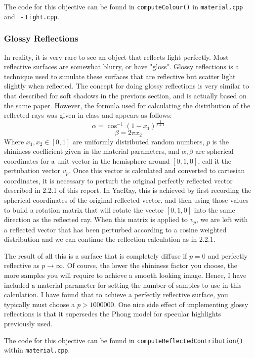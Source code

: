 \documentclass[12pt]{article}
\begin{document}
The code for this objective can be found in \texttt{computeColour()} in \texttt{material.cpp} and \ - \texttt{Light.cpp}.
\subsubsection{Glossy Reflections}

In reality, it is very rare to see an object that reflects light perfectly. Most reflective surfaces are somewhat blurry, or have "gloss". Glossy reflections is a technique used to simulate these surfaces that are reflective but scatter light slightly when reflected. The concept for doing glossy reflections is very similar to that described for soft shadows in the previous section, and is actually based on the same paper\cite{distributed}. However, the formula used for calculating the distribution of the reflected rays was given in class and appears as follows:
$$\alpha = \cos^{-1}{(1 - x_1)}^{\frac{1}{p + 1}}$$
$$\beta = 2\pi x_2$$
Where $x_1,x_2\in[0,1]$ are uniformly distributed random numbers, $p$ is the shininess coefficient given in the material parameters, and $\alpha, \beta$ are spherical coordinates for a unit vector in the hemisphere around $[0,1,0]$, call it the pertubation vector $v_p$. Once this vector is calculated and converted to cartesian coordinates, it is necessary to perturb the original perfectly reflected vector described in 2.2.1 of this report. In YacRay, this is achieved by first recording the spherical coordinates of the original reflected vector, and then using those values to build a rotation matrix that will rotate the vector $[0,1,0]$ into the same direction as the reflected ray. When this matrix is applied to $v_p$, we are left with a reflected vector that has been perturbed according to a cosine weighted distribution and we can continue the reflection calculation as in 2.2.1.

The result of all this is a surface that is completely diffuse if $p=0$ and perfectly reflective as $p\to\infty$. Of course, the lower the shininess factor you choose, the more samples you will require to achieve a smooth looking image. Hence, I have included a material parameter for setting the number of samples to use in this calculation. I have found that to achieve a perfectly reflective surface, you typically must choose a $p>1000000$. One nice side effect of implementing glossy reflections is that it supersedes the Phong model for specular highlights previously used.

The code for this objective can be found in \texttt{computeReflectedContribution()} within \texttt{material.cpp}.
\end{document}

